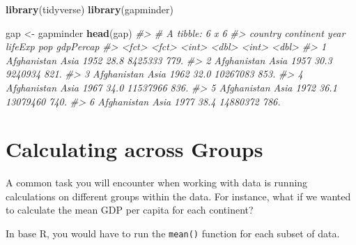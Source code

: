 \documentclass[]{book}
\newenvironment{Shaded}{\begin{snugshade}}{\end{snugshade}}
\newcommand{\KeywordTok}[1]{\textcolor[rgb]{0.13,0.29,0.53}{\textbf{#1}}}
\newcommand{\StringTok}[1]{\textcolor[rgb]{0.31,0.60,0.02}{#1}}
\newcommand{\CommentTok}[1]{\textcolor[rgb]{0.56,0.35,0.01}{\textit{#1}}}
\newcommand{\OperatorTok}[1]{\textcolor[rgb]{0.81,0.36,0.00}{\textbf{#1}}}
\newcommand{\NormalTok}[1]{#1}
\begin{document}
\begin{Shaded}
\begin{Highlighting}[]
\KeywordTok{library}\NormalTok{(tidyverse)}
\KeywordTok{library}\NormalTok{(gapminder)}

\NormalTok{gap <-}\StringTok{ }\NormalTok{gapminder}
\KeywordTok{head}\NormalTok{(gap)}
\CommentTok{#> # A tibble: 6 x 6}
\CommentTok{#>   country     continent  year lifeExp      pop gdpPercap}
\CommentTok{#>   <fct>       <fct>     <int>   <dbl>    <int>     <dbl>}
\CommentTok{#> 1 Afghanistan Asia       1952    28.8  8425333      779.}
\CommentTok{#> 2 Afghanistan Asia       1957    30.3  9240934      821.}
\CommentTok{#> 3 Afghanistan Asia       1962    32.0 10267083      853.}
\CommentTok{#> 4 Afghanistan Asia       1967    34.0 11537966      836.}
\CommentTok{#> 5 Afghanistan Asia       1972    36.1 13079460      740.}
\CommentTok{#> 6 Afghanistan Asia       1977    38.4 14880372      786.}
\end{Highlighting}
\end{Shaded}

\section{Calculating across Groups}\label{calculating-across-groups}

A common task you will encounter when working with data is running
calculations on different groups within the data. For instance, what if
we wanted to calculate the mean GDP per capita for each continent?

In base R, you would have to run the \texttt{mean()} function for each
subset of data.

\begin{Shaded}
\end{Shaded}
\end{document}
